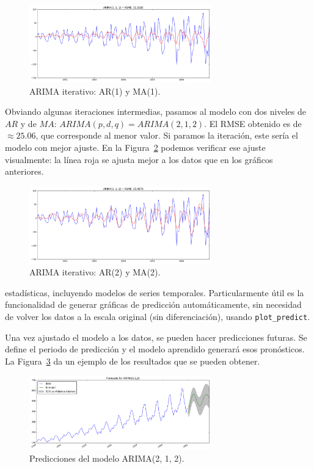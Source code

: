 \documentclass[11pt,spanish,listoffigures,listoftables]{tfgetsinf}
\begin{document}
    \begin{figure}[h]
        \centering
        \includegraphics[width=0.7\textwidth]{arima_111.png}
        \caption{ARIMA iterativo: AR(1) y MA(1).}
        \label{fig:iterative_arima_arma_1}
    \end{figure}
        
    Obviando algunas iteraciones intermedias, pasamos al modelo con dos niveles de \(AR\) y de \(MA\): \(ARIMA(p, d, q)=ARIMA(2, 1, 2)\). El RMSE obtenido es de \(\approx25.06\), que corresponde al menor valor. Si paramos la iteración, este sería el modelo con mejor ajuste. En la Figura~\ref{fig:iterative_arima_arma_2} podemos verificar ese ajuste visualmente: la línea roja se ajusta mejor a los datos que en los gráficos anteriores.
  
    \begin{figure}[h]
        \centering
        \includegraphics[width=0.7\textwidth]{arima_212.png}
        \caption{ARIMA iterativo: AR(2) y MA(2).}
        \label{fig:iterative_arima_arma_2}
    \end{figure}
    
    estadísticas, incluyendo modelos de series temporales. Particularmente útil es la funcionalidad de generar gráficas de predicción automáticamente, sin necesidad de volver los datos a la escala original (sin diferenciación), usando {\tt plot\_predict}. 

    Una vez ajustado el modelo a los datos, se pueden hacer predicciones futuras. Se define el periodo de predicción y el modelo aprendido generará esos pronósticos. La Figura~\ref{fig:forecast} da un ejemplo de los resultados que se pueden obtener. 

    \begin{figure}[h]
        \centering
        \includegraphics[width=0.7\textwidth]{forecast.png}
        \caption{Predicciones del modelo ARIMA(2, 1, 2).}
        \label{fig:forecast}
    \end{figure}
\end{document}
